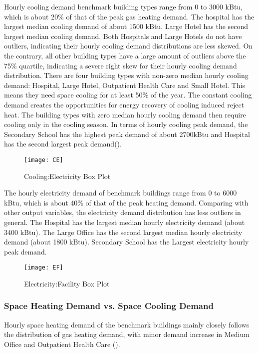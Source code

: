 Hourly cooling demand benchmark building types range from 0 to 3000
kBtu, which is about 20\% of that of the peak gas heating demand. The
hospital has the largest median cooling demand of about 1500
kBtu. Large Hotel has the second largest median cooling demand. Both
Hospitals and Large Hotels do not have outliers, indicating their
hourly cooling demand distributions are less skewed. On the contrary,
all other building types have a large amount of outliers above the
75\% quartile, indicating a severe right skew for their hourly cooling
demand distribution. There are four building types with non-zero
median hourly cooling demand: Hospital, Large Hotel, Outpatient Health
Care and Small Hotel. This means they need space cooling for at least
50\% of the year. The constant cooling demand creates the
opportunities for energy recovery of cooling induced reject heat. The
building types with zero median hourly cooling demand then require
cooling only in the cooling season. In terms of hourly cooling peak
demand, the Secondary School has the highest peak demand of about
2700kBtu and Hospital has the second largest peak
demand().
\begin{figure}[h!]
  \centering
  \texttt{[image: CE]}
  \caption[Cooling:Electricity Box Plot]{Cooling:Electricity Box Plot}
  \label{fig:CE}
\end{figure}%

The hourly electricity demand of benchmark buildings range from 0 to
6000 kBtu, which is about 40\% of that of the peak heating
demand. Comparing with other output variables, the electricity demand
distribution has less outliers in general. The Hospital has the
largest median hourly electricity demand (about 3400 kBtu). The Large
Office has the second largest median hourly electricity demand (about
1800 kBtu). Secondary School has the Largest electricity hourly peak
demand.

\begin{figure}[h!]
  \centering
  \texttt{[image: EF]}
  \caption[Electricity:Facility Box Plot]{Electricity:Facility Box
    Plot}
  \label{fig:EF}
\end{figure}%

\subsubsection{Space Heating Demand vs. Space Cooling Demand}
Hourly space heating demand of the benchmark buildings mainly closely
follows the distribution of gas heating demand, with minor demand
increase in Medium Office and Outpatient Health Care ().

